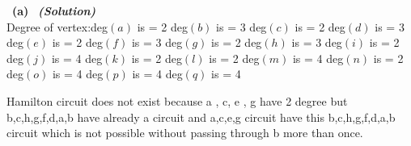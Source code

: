 \documentclass[a4 paper]{article}
\newcommand{\subproblem}[1]{~\newline\textbf{(#1)}}
\newcommand{\solutionx}{~\textbf{\textit{(Solution)}} }
\newcommand{\0}{\mathbf{0}}
\begin{document}
\subproblem{a} \solutionx\\
Degree of vertex:deg$(a)$ is = 2 \newline
deg$(b)$ is = 3 \newline
deg$(c)$ is = 2\newline
deg$(d)$ is = 3\newline
deg$(e)$ is = 2\newline
deg$(f)$ is = 3\newline
deg$(g)$ is = 2\newline
deg$(h)$ is = 3\newline
deg$(i)$ is = 2\newline
deg$(j)$ is = 4\newline
deg$(k)$ is = 2\newline
deg$(l)$ is = 2\newline
deg$(m)$ is = 4\newline
deg$(n)$ is = 2\newline
deg$(o)$ is = 4\newline
deg$(p)$ is = 4\newline
deg$(q)$ is = 4\newline

Hamilton circuit does not exist because a , c, e , g have 2 degree but b,c,h,g,f,d,a,b have already a circuit and a,c,e,g circuit have this b,c,h,g,f,d,a,b circuit which is not possible without passing through b more than once.
\end{document}
